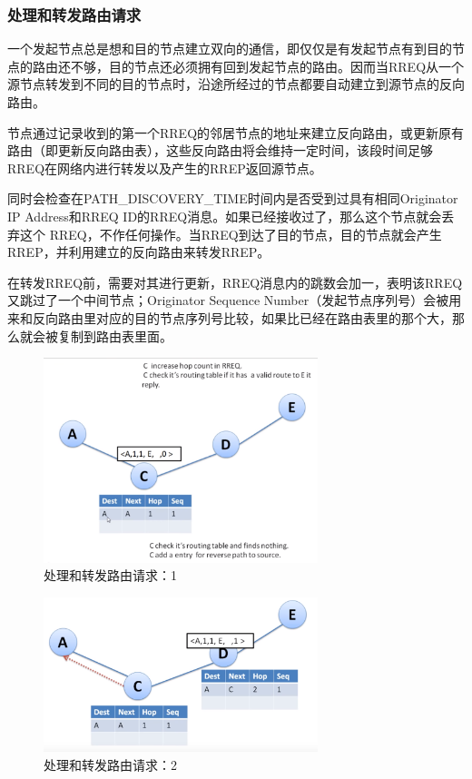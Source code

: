 \documentclass[12pt,a4paper]{article}
\begin{document}
\subsubsection{处理和转发路由请求}
一个发起节点总是想和目的节点建立双向的通信，即仅仅是有发起节点有到目的节点的路由还不够，目的节点还必须拥有回到发起节点的路由。因而当RREQ从一个源节点转发到不同的目的节点时，沿途所经过的节点都要自动建立到源节点的反向路由。

节点通过记录收到的第一个RREQ的邻居节点的地址来建立反向路由，或更新原有路由（即更新反向路由表），这些反向路由将会维持一定时间，该段时间足够RREQ在网络内进行转发以及产生的RREP返回源节点。

同时会检查在PATH\_DISCOVERY\_TIME时间内是否受到过具有相同Originator IP Address和RREQ ID的RREQ消息。如果已经接收过了，那么这个节点就会丢弃这个 RREQ，不作任何操作。当RREQ到达了目的节点，目的节点就会产生RREP，并利用建立的反向路由来转发RREP。

在转发RREQ前，需要对其进行更新，RREQ消息内的跳数会加一，表明该RREQ 又跳过了一个中间节点；Originator Sequence Number（发起节点序列号）会被用来和反向路由里对应的目的节点序列号比较，如果比已经在路由表里的那个大，那么就会被复制到路由表里面。

\begin{figure}[htb]
\centering
\includegraphics[width=8cm]{handle_route_request_1}
\caption{处理和转发路由请求：1}
\end{figure}

\begin{figure}[htb]
\centering
\includegraphics[width=8cm]{handle_route_request_2}
\caption{处理和转发路由请求：2}
\end{figure}
\end{document}
